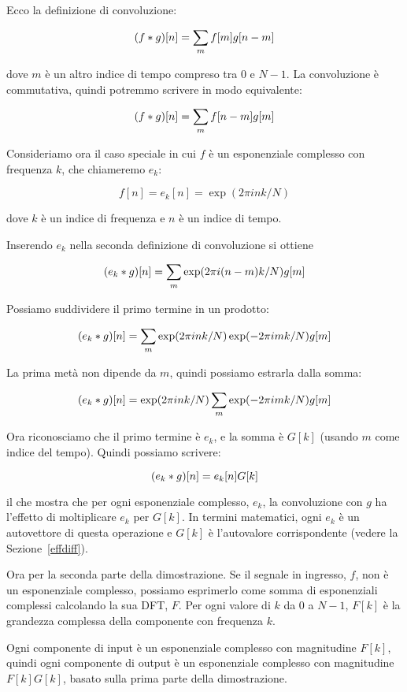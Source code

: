 \documentclass[12pt,a4paper]{book}
\begin{document}
%
Ecco la definizione di convoluzione:

%
\[ (f \ast g)[n] = \sum_m f[m] g[n-m] \] 

%
dove $m$ è un altro indice di tempo compreso tra 0 e $N-1$. La convoluzione è commutativa, quindi potremmo scrivere in modo equivalente:

%
\[ (f \ast g)[n] = \sum_m f[n-m] g[m] \] 

%
Consideriamo ora il caso speciale in cui $f$ è un esponenziale complesso con frequenza $k$, che chiameremo $e_k$:

%
\[ f[n] = e_k[n] = \exp(2 \pi i n k / N) \] 

%
dove $k$ è un indice di frequenza e $n$ è un indice di tempo.

Inserendo $e_k$ nella seconda definizione di convoluzione si ottiene

%
\[ (e_k \ast g)[n] = \sum_m \exp(2 \pi i (n-m) k / N) g[m] \] 

%
Possiamo suddividere il primo termine in un prodotto:

%
\[ (e_k \ast g)[n] = \sum_m \exp(2 \pi i n k / N) \exp(-2 \pi i m k / N) g[m] \] 

%
La prima metà non dipende da $m$, quindi possiamo estrarla dalla somma:

%
\[ (e_k \ast g)[n] = \exp(2 \pi i n k / N) \sum_m \exp(-2 \pi i m k / N) g[m] \] 

%
Ora riconosciamo che il primo termine è $e_k$, e la somma è $G[k]$ (usando $m$ come indice del tempo). Quindi possiamo scrivere:

%
\[ (e_k \ast g)[n] = e_k[n] G[k] \] 

%
il che mostra che per ogni esponenziale complesso, $e_k$, la convoluzione con $g$ ha l'effetto di moltiplicare $e_k$ per $G[k]$. In termini matematici, ogni $e_k$ è un autovettore di questa operazione e $G[k]$ è l'autovalore corrispondente (vedere la Sezione~\ref{effdiff}).

Ora per la seconda parte della dimostrazione. Se il segnale in ingresso, $f$, non è un esponenziale complesso, possiamo esprimerlo come somma di esponenziali complessi calcolando la sua DFT, $F$. Per ogni valore di $k$ da 0 a $N-1$, $F[k]$ è la grandezza complessa della componente con frequenza $k$.

Ogni componente di input è un esponenziale complesso con magnitudine $F[k]$, quindi ogni componente di output è un esponenziale complesso con magnitudine $F[k] G[k]$, basato sulla prima parte della dimostrazione.
\end{document}
